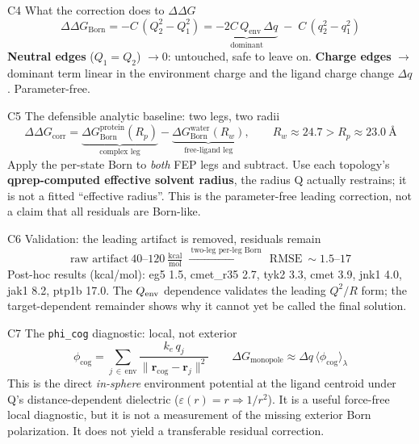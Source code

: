 \documentclass[11pt]{article}
\newcommand{\gap}{\vspace{10pt}}
\newcommand{\eq}[1]{{\large\[#1\]}}
\begin{document}
\begin{bridge}{C4 \;\textbullet\; What the correction does to $\Delta\Delta G$}
\eq{\Delta\Delta G_{\text{Born}}=-C\,(Q_2^2-Q_1^2)
   =\underbrace{-2C\,Q_{\text{env}}\,\Delta q}_{\text{dominant}}\;-\;C\,(q_2^2-q_1^2)}
\small \textbf{Neutral edges} ($Q_1=Q_2$) $\to 0$: untouched, safe to leave on.
\textbf{Charge edges} $\to$ dominant term linear in the environment charge and the ligand charge
change $\Delta q$. Parameter-free.
\end{bridge}
\gap

\begin{bridge}{C5 \;\textbullet\; The defensible analytic baseline: two legs, two radii}
\eq{\Delta\Delta G_{\text{corr}}
   =\underbrace{\Delta G_{\text{Born}}^{\text{protein}}(R_p)}_{\text{complex leg}}
   -\underbrace{\Delta G_{\text{Born}}^{\text{water}}(R_w)}_{\text{free-ligand leg}},
   \qquad R_w\approx24.7 > R_p\approx23.0\ \text{\AA}}
\small Apply the per-state Born to \emph{both} FEP legs and subtract. Use each topology's
\textbf{qprep-computed effective solvent radius}, the radius Q actually restrains; it is not a fitted
``effective radius''. This is the parameter-free leading correction, not a claim that all residuals
are Born-like.
\end{bridge}
\gap

\begin{bridge}{C6 \;\textbullet\; Validation: the leading artifact is removed, residuals remain}
\eq{\text{raw artifact}\ 40\text{--}120\ \tfrac{\text{kcal}}{\text{mol}}
   \;\xrightarrow{\ \text{two-leg per-leg Born}\ }\;
   \text{RMSE}\ \sim 1.5\text{--}17}
\small Post-hoc results (kcal/mol): eg5 1.5, cmet\_r35 2.7, tyk2 3.3, cmet 3.9,
jnk1 4.0, jak1 8.2, ptp1b 17.0. The $Q_{\rm env}$ dependence validates the leading
$Q^2/R$ form; the target-dependent remainder shows why it cannot yet be called the final solution.
\end{bridge}
\gap

\begin{bridge}{C7 \;\textbullet\; The \texttt{phi\_cog} diagnostic: local, not exterior}
\eq{\phi_{\mathrm{cog}}=\sum_{j\,\in\,\text{env}}\frac{k_e\,q_j}{\lVert\mathbf{r}_{\mathrm{cog}}-\mathbf{r}_j\rVert^{2}}
   \qquad
   \Delta G_{\text{monopole}}\approx\Delta q\,\bigl\langle\phi_{\mathrm{cog}}\bigr\rangle_\lambda}
\small This is the direct \emph{in-sphere} environment potential at the ligand centroid under Q's
distance-dependent dielectric ($\varepsilon(r)=r\Rightarrow1/r^2$). It is a useful force-free local
diagnostic, but it is not a measurement of the missing exterior Born polarization. It does not yield
a transferable residual correction.
\end{bridge}
\gap
\end{document}
